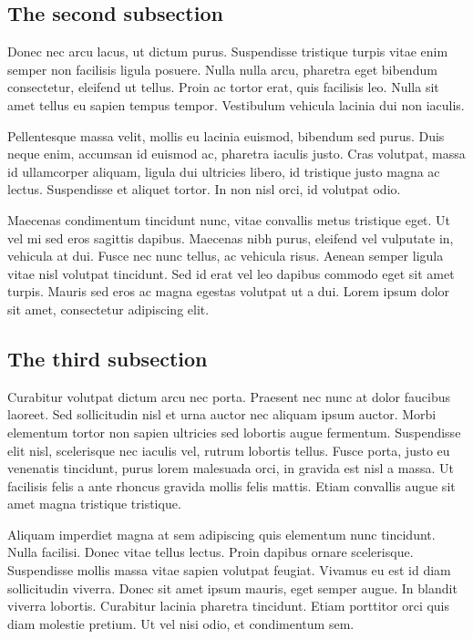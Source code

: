 \subsection{The second subsection}
\label{ch7:second:b}
Donec nec arcu lacus, ut dictum purus. Suspendisse tristique turpis vitae enim semper non facilisis ligula posuere. Nulla nulla arcu, pharetra eget bibendum consectetur, eleifend ut tellus. Proin ac tortor erat, quis facilisis leo. Nulla sit amet tellus eu sapien tempus tempor. Vestibulum vehicula lacinia dui non iaculis. 

Pellentesque massa velit, mollis eu lacinia euismod, bibendum sed purus. Duis neque enim, accumsan id euismod ac, pharetra iaculis justo. Cras volutpat, massa id ullamcorper aliquam, ligula dui ultricies libero, id tristique justo magna ac lectus. Suspendisse et aliquet tortor. In non nisl orci, id volutpat odio. 

Maecenas condimentum tincidunt nunc, vitae convallis metus tristique eget. Ut vel mi sed eros sagittis dapibus. Maecenas nibh purus, eleifend vel vulputate in, vehicula at dui. Fusce nec nunc tellus, ac vehicula risus. Aenean semper ligula vitae nisl volutpat tincidunt. Sed id erat vel leo dapibus commodo eget sit amet turpis. Mauris sed eros ac magna egestas volutpat ut a dui. Lorem ipsum dolor sit amet, consectetur adipiscing elit.

\subsection{The third subsection}
\label{ch7:second:c}
Curabitur volutpat dictum arcu nec porta. Praesent nec nunc at dolor faucibus laoreet. Sed sollicitudin nisl et urna auctor nec aliquam ipsum auctor. Morbi elementum tortor non sapien ultricies sed lobortis augue fermentum. Suspendisse elit nisl, scelerisque nec iaculis vel, rutrum lobortis tellus. Fusce porta, justo eu venenatis tincidunt, purus lorem malesuada orci, in gravida est nisl a massa. Ut facilisis felis a ante rhoncus gravida mollis felis mattis. Etiam convallis augue sit amet magna tristique tristique. 

Aliquam imperdiet magna at sem adipiscing quis elementum nunc tincidunt. Nulla facilisi. Donec vitae tellus lectus. Proin dapibus ornare scelerisque. Suspendisse mollis massa vitae sapien volutpat feugiat. Vivamus eu est id diam sollicitudin viverra. Donec sit amet ipsum mauris, eget semper augue. In blandit viverra lobortis. Curabitur lacinia pharetra tincidunt. Etiam porttitor orci quis diam molestie pretium. Ut vel nisi odio, et condimentum sem.

